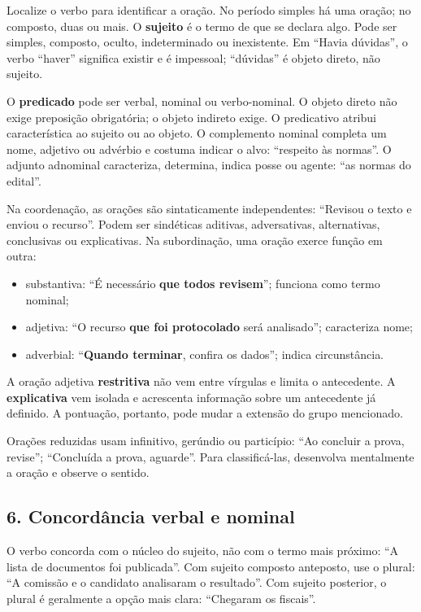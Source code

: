 \documentclass[11pt,a4paper]{article}
\begin{document}
Localize o verbo para identificar a oração. No período simples há uma oração; no composto, duas ou mais. O \textbf{sujeito} é o termo de que se declara algo. Pode ser simples, composto, oculto, indeterminado ou inexistente. Em “Havia dúvidas”, o verbo “haver” significa existir e é impessoal; “dúvidas” é objeto direto, não sujeito.

O \textbf{predicado} pode ser verbal, nominal ou verbo-nominal. O objeto direto não exige preposição obrigatória; o objeto indireto exige. O predicativo atribui característica ao sujeito ou ao objeto. O complemento nominal completa um nome, adjetivo ou advérbio e costuma indicar o alvo: “respeito às normas”. O adjunto adnominal caracteriza, determina, indica posse ou agente: “as normas do edital”.

Na coordenação, as orações são sintaticamente independentes: “Revisou o texto e enviou o recurso”. Podem ser sindéticas aditivas, adversativas, alternativas, conclusivas ou explicativas. Na subordinação, uma oração exerce função em outra:

\begin{itemize}
  \item substantiva: “É necessário \textbf{que todos revisem}”; funciona como termo nominal;
  \item adjetiva: “O recurso \textbf{que foi protocolado} será analisado”; caracteriza nome;
  \item adverbial: “\textbf{Quando terminar}, confira os dados”; indica circunstância.
\end{itemize}

A oração adjetiva \textbf{restritiva} não vem entre vírgulas e limita o antecedente. A \textbf{explicativa} vem isolada e acrescenta informação sobre um antecedente já definido. A pontuação, portanto, pode mudar a extensão do grupo mencionado.

Orações reduzidas usam infinitivo, gerúndio ou particípio: “Ao concluir a prova, revise”; “Concluída a prova, aguarde”. Para classificá-las, desenvolva mentalmente a oração e observe o sentido.

\subsection*{6. Concordância verbal e nominal}

O verbo concorda com o núcleo do sujeito, não com o termo mais próximo: “A lista de documentos foi publicada”. Com sujeito composto anteposto, use o plural: “A comissão e o candidato analisaram o resultado”. Com sujeito posterior, o plural é geralmente a opção mais clara: “Chegaram os fiscais”.
\end{document}
